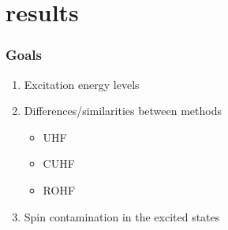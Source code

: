 \documentclass[aspectratio=169]{beamer}
\begin{document}
\section{results}

\begin{frame}
    \frametitle{Goals}
    \begin{enumerate}
        \item Excitation energy levels
        \item Differences/similarities between methods
        \begin{itemize}
            \item UHF
            \item CUHF
            \item ROHF
        \end{itemize}
        \item Spin contamination in the excited states
    \end{enumerate}

    

\end{frame}
\end{document}

